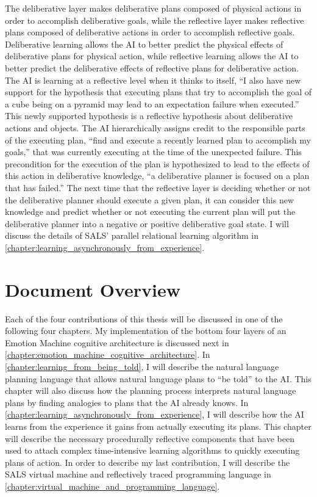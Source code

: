 The deliberative layer makes deliberative plans composed of physical
actions in order to accomplish deliberative goals, while the
reflective layer makes reflective plans composed of deliberative
actions in order to accomplish reflective goals.  Deliberative
learning allows the AI to better predict the physical effects of
deliberative plans for physical action, while reflective learning
allows the AI to better predict the deliberative effects of reflective
plans for deliberative action.  The AI is learning at a reflective
level when it thinks to itself, ``I also have new support for the
hypothesis that executing plans that try to accomplish the goal of a
cube being on a pyramid may lead to an expectation failure when
executed.''  This newly supported hypothesis is a reflective
hypothesis about deliberative actions and objects.  The AI
hierarchically assigns credit to the responsible parts of the
executing plan, ``find and execute a recently learned plan to
accomplish my goals,'' that was currently executing at the time of the
unexpected failure.  This precondition for the execution of the plan
is hypothesized to lead to the effects of this action in deliberative
knowledge, ``a deliberative planner is focused on a plan that has
failed.''  The next time that the reflective layer is deciding whether
or not the deliberative planner should execute a given plan, it can
consider this new knowledge and predict whether or not executing the
current plan will put the deliberative planner into a negative or
positive deliberative goal state.  I will discuss the details of SALS'
parallel relational learning algorithm in
{\mbox{\autoref{chapter:learning_asynchronously_from_experience}}}.

\section{Document Overview}

Each of the four contributions of this thesis will be discussed in one
of the following four chapters.  My implementation of the bottom four
layers of an Emotion Machine cognitive architecture is discussed next
in {\mbox{\autoref{chapter:emotion_machine_cognitive_architecture}}}.
In {\mbox{\autoref{chapter:learning_from_being_told}}}, I will
describe the natural language planning language that allows natural
language plans to ``be told'' to the AI.  This chapter will also
discuss how the planning process interprets natural language plans by
finding analogies to plans that the AI already knows.  In
{\mbox{\autoref{chapter:learning_asynchronously_from_experience}}}, I
will describe how the AI learns from the experience it gains from
actually executing its plans.  This chapter will describe the
necessary procedurally reflective components that have been used to
attach complex time-intensive learning algorithms to quickly executing
plans of action.  In order to describe my last contribution, I will
describe the SALS virtual machine and reflectively traced programming
language in
{\mbox{\autoref{chapter:virtual_machine_and_programming_language}}}.

